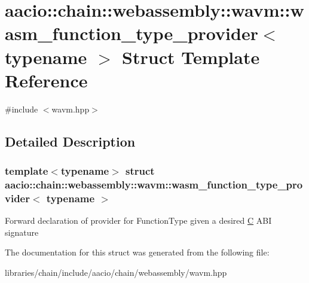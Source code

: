 \hypertarget{structaacio_1_1chain_1_1webassembly_1_1wavm_1_1wasm__function__type__provider}{}\section{aacio\+:\+:chain\+:\+:webassembly\+:\+:wavm\+:\+:wasm\+\_\+function\+\_\+type\+\_\+provider$<$ typename $>$ Struct Template Reference}
\label{structaacio_1_1chain_1_1webassembly_1_1wavm_1_1wasm__function__type__provider}


{\ttfamily \#include $<$wavm.\+hpp$>$}



\subsection{Detailed Description}
\subsubsection*{template$<$typename$>$\newline
struct aacio\+::chain\+::webassembly\+::wavm\+::wasm\+\_\+function\+\_\+type\+\_\+provider$<$ typename $>$}

Forward declaration of provider for Function\+Type given a desired \mbox{\hyperlink{struct_c}{C}} A\+BI signature 

The documentation for this struct was generated from the following file\+:\begin{DoxyCompactItemize}
\item 
libraries/chain/include/aacio/chain/webassembly/wavm.\+hpp\end{DoxyCompactItemize}
